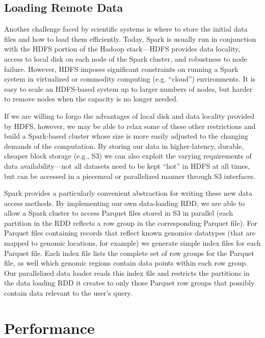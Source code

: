 \documentclass{acm_proc_article-sp}
\begin{document}
\subsection{Loading Remote Data}
\label{sec:loading-remote-data}

Another challenge faced by scientific systems is where to store the initial data files and how to load them
efficiently. Today, Spark is usually run in conjunction with the HDFS portion of the Hadoop stack---HDFS
provides data locality, access to local disk on each node of the Spark cluster, and robustness to node
failure. However, HDFS imposes significant constraints on running a Spark system in virtualized or
commodity computing (e.g. ``cloud'') environments.  It is easy to scale an HDFS-based system up to
larger numbers of nodes, but harder to remove nodes when the capacity is no longer needed.  

If we are willing to forgo the advantages of local disk and data locality provided by HDFS, however, we
may be able to relax some of these other restrictions and build a Spark-based cluster whose size is more
easily adjusted to the changing demands of the computation. By storing our data in higher-latency,
durable, cheaper block storage (e.g., S3) we can also exploit the varying requirements of data \linebreak
availability---not all datasets need to be kept ``hot'' in HDFS at all times, but can be accessed in a
piecemeal or parallelized manner through S3 interfaces.

Spark provides a particularly convenient abstraction for writing these new data access methods.  By
implementing our own data-loading RDD, we are able to allow a Spark cluster to access Parquet files
stored in S3 in parallel (each partition in the RDD reflects a row group in the corresponding Parquet file).
For Parquet files containing records that reflect known genomics datatypes (that are mapped to genomic
locations, for example) we generate simple index files for each Parquet file.  Each index file lists the
complete set of row groups for the Parquet file, as well which genomic regions contain data points within
each row group.  Our parallelized data loader reads this index file and restricts the partitions in the data
loading RDD it creates to only those Parquet row groups that possibly contain data relevant to the
user's query.

\section{Performance}
\label{sec:performance}
\end{document}
